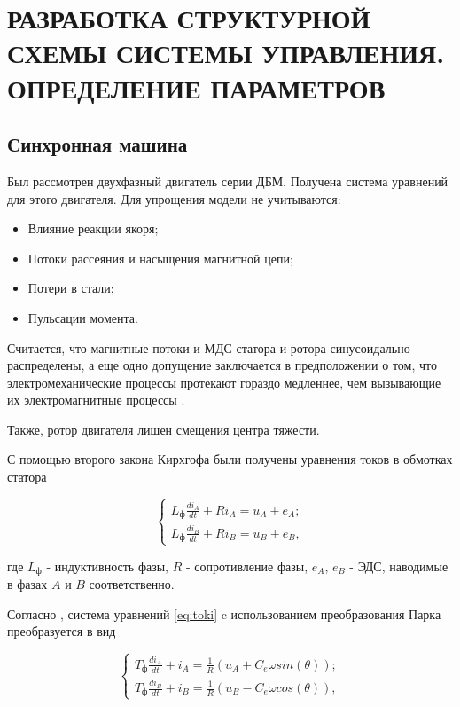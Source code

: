 \section{РАЗРАБОТКА СТРУКТУРНОЙ СХЕМЫ СИСТЕМЫ УПРАВЛЕНИЯ. ОПРЕДЕЛЕНИЕ ПАРАМЕТРОВ}

\subsection{Синхронная машина}

Был рассмотрен двухфазный двигатель серии ДБМ. Получена система 
уравнений для этого двигателя. Для упрощения модели не учитываются:
\begin{itemize}
  \item Влияние реакции якоря;
  \item Потоки рассеяния и насыщения магнитной цепи;
  \item Потери в стали;
  \item Пульсации момента.
\end{itemize}
Считается, что магнитные потоки и МДС статора и ротора синусоидально
распределены, а еще одно допущение заключается в предположении о том, что
электромеханические процессы протекают гораздо медленнее, чем вызывающие их 
электромагнитные процессы \cite{БеленькийМикеровМоментныйПривод}. 

Также, ротор двигателя лишен смещения центра тяжести.

С помощью второго закона Кирхгофа были получены уравнения токов в обмотках
статора

\begin{equation}
  \begin{cases}
    L_{\text{ф}}\frac{di_A}{dt}+Ri_A=u_A+e_A;
    \\
    L_{\text{ф}}\frac{di_B}{dt}+Ri_B=u_B+e_B,
  \end{cases}
  \label{eq:toki}
\end{equation}

где $L_{\text{ф}}$ - индуктивность фазы, $R$ - сопротивление фазы, 
$e_A$, $e_B$ - ЭДС, наводимые в фазах $A$ и $B$ соответственно.

Согласно \cite{БеленькийМикеровМоментныйПривод}, система уравнений 
\ref{eq:toki} c 
использованием преобразования Парка преобразуется в вид

\begin{equation}
  \begin{cases}
    T_{\text{ф}}\frac{di_A}{dt}+i_A=\frac{1}{R}(u_A+C_e\omega sin(\theta));
    \\
    T_{\text{ф}}\frac{di_B}{dt}+i_B=\frac{1}{R}(u_B-C_e\omega cos(\theta)),
  \end{cases}
  \label{eq:toki2}
\end{equation}

